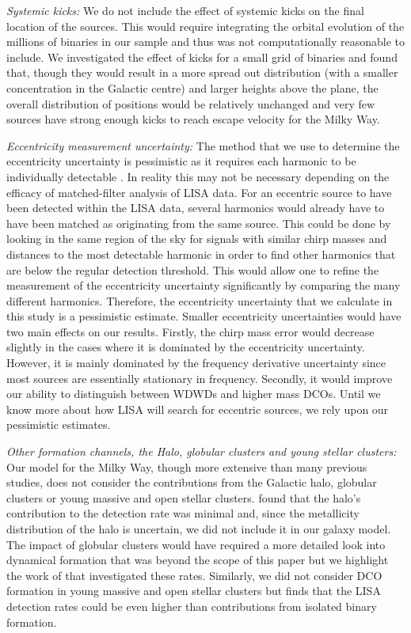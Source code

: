 \textit{Systemic kicks:} We do not include the effect of systemic kicks on the final location of the sources. This would require integrating the orbital evolution of the millions of binaries in our sample and thus was not computationally reasonable to include. We investigated the effect of kicks for a small grid of binaries and found that, though they would result in a more spread out distribution (with a smaller concentration in the Galactic centre) and larger heights above the plane, the overall distribution of positions would be relatively unchanged and very few sources have strong enough kicks to reach escape velocity for the Milky Way.

\textit{Eccentricity measurement uncertainty:} The method that we use to determine the eccentricity uncertainty is pessimistic as it requires each harmonic to be individually detectable \citep[e.g.][]{Lau+2020}. In reality this may not be necessary depending on the efficacy of matched-filter analysis of LISA data. For an eccentric source to have been detected within the LISA data, several harmonics would already have to have been matched as originating from the same source. This could be done by looking in the same region of the sky for signals with similar chirp masses and distances to the most detectable harmonic in order to find other harmonics that are below the regular detection threshold. This would allow one to refine the measurement of the eccentricity uncertainty significantly by comparing the many different harmonics. Therefore, the eccentricity uncertainty that we calculate in this study is a pessimistic estimate. Smaller eccentricity uncertainties would have two main effects on our results. Firstly, the chirp mass error would decrease slightly in the cases where it is dominated by the eccentricity uncertainty. However, it is mainly dominated by the frequency derivative uncertainty since most sources are essentially stationary in frequency. Secondly, it would improve our ability to distinguish between WDWDs and higher mass DCOs. Until we know more about how LISA will search for eccentric sources, we rely upon our pessimistic estimates.

\textit{Other formation channels, the Halo, globular clusters and young stellar clusters:} Our model for the Milky Way, though more extensive than many previous studies, does not consider the contributions from the Galactic halo, globular clusters or young massive and open stellar clusters. \citet{Lamberts+2018} found that the halo's contribution to the detection rate was minimal and, since the metallicity distribution of the halo is uncertain, we did not include it in our galaxy model. The impact of globular clusters would have required a more detailed look into dynamical formation that was beyond the scope of this paper but we highlight the work of \citet{Kremer+2018} that investigated these rates. Similarly, we did not consider DCO formation in young massive and open stellar clusters but \citet{Banerjee+2020} finds that the LISA detection rates could be even higher than contributions from isolated binary formation.

